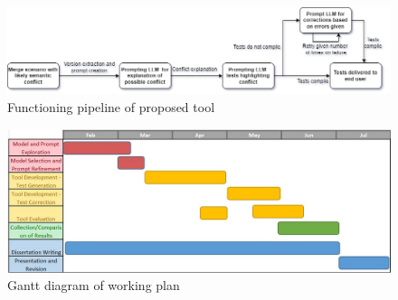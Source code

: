 \begin{figure}
    \centering
    \includegraphics[width=1\linewidth]{figures/tool.png}
    \caption{Functioning pipeline of proposed tool}
    \label{fig:tool}
\end{figure}

\begin{figure}
    \centering
    \includegraphics[width=1\linewidth]{figures/gantt.jpg}
    \caption{Gantt diagram of working plan}
    \label{fig:gantt}
\end{figure}